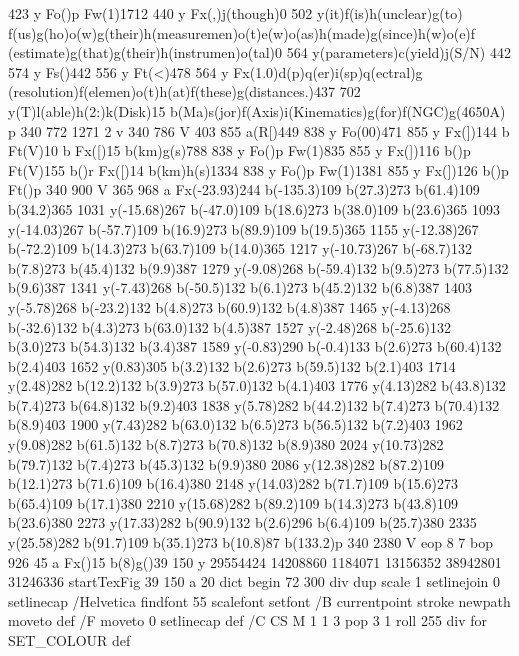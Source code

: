 {{{{{{{{{{{{{{{{423 y Fo()p Fw(1)1712 440 y Fx(,)j(though)0 502 y(it)f(is)h(unclear)g(to)
f(us)g(ho)o(w)g(their)h(measuremen)o(t)e(w)o(as)h(made)g(since)h(w)o(e)f
(estimate)g(that)g(their)h(instrumen)o(tal)0 564 y(parameters)c(yield)j(S/N)
442 574 y Fs()442 556 y Ft(<)478 564 y Fx(1.0)d(p)q(er)i(sp)q(ectral)g
(resolution)f(elemen)o(t)h(at)f(these)g(distances.)437 702
y(T)l(able)h(2:)k(Disk)15 b(Ma)s(jor)f(Axis)i(Kinematics)g(for)f(NGC)g(4650A)
p 340 772 1271 2 v 340 786 V 403 855 a(R[)449 838 y Fo(00)471
855 y Fx(])144 b Ft(V)10 b Fx([)15 b(km)g(s)788 838 y Fo()p
Fw(1)835 855 y Fx(])116 b()p Ft(V)155 b()r Fx([)14
b(km)h(s)1334 838 y Fo()p Fw(1)1381 855 y Fx(])126 b()p
Ft()p 340 900 V 365 968 a Fx(-23.93)244 b(-135.3)109 b(27.3)273
b(61.4)109 b(34.2)365 1031 y(-15.68)267 b(-47.0)109 b(18.6)273
b(38.0)109 b(23.6)365 1093 y(-14.03)267 b(-57.7)109 b(16.9)273
b(89.9)109 b(19.5)365 1155 y(-12.38)267 b(-72.2)109 b(14.3)273
b(63.7)109 b(14.0)365 1217 y(-10.73)267 b(-68.7)132 b(7.8)273
b(45.4)132 b(9.9)387 1279 y(-9.08)268 b(-59.4)132 b(9.5)273
b(77.5)132 b(9.6)387 1341 y(-7.43)268 b(-50.5)132 b(6.1)273
b(45.2)132 b(6.8)387 1403 y(-5.78)268 b(-23.2)132 b(4.8)273
b(60.9)132 b(4.8)387 1465 y(-4.13)268 b(-32.6)132 b(4.3)273
b(63.0)132 b(4.5)387 1527 y(-2.48)268 b(-25.6)132 b(3.0)273
b(54.3)132 b(3.4)387 1589 y(-0.83)290 b(-0.4)133 b(2.6)273
b(60.4)132 b(2.4)403 1652 y(0.83)305 b(3.2)132 b(2.6)273 b(59.5)132
b(2.1)403 1714 y(2.48)282 b(12.2)132 b(3.9)273 b(57.0)132 b(4.1)403
1776 y(4.13)282 b(43.8)132 b(7.4)273 b(64.8)132 b(9.2)403 1838
y(5.78)282 b(44.2)132 b(7.4)273 b(70.4)132 b(8.9)403 1900 y(7.43)282
b(63.0)132 b(6.5)273 b(56.5)132 b(7.2)403 1962 y(9.08)282 b(61.5)132
b(8.7)273 b(70.8)132 b(8.9)380 2024 y(10.73)282 b(79.7)132
b(7.4)273 b(45.3)132 b(9.9)380 2086 y(12.38)282 b(87.2)109
b(12.1)273 b(71.6)109 b(16.4)380 2148 y(14.03)282 b(71.7)109
b(15.6)273 b(65.4)109 b(17.1)380 2210 y(15.68)282 b(89.2)109
b(14.3)273 b(43.8)109 b(23.6)380 2273 y(17.33)282 b(90.9)132
b(2.6)296 b(6.4)109 b(25.7)380 2335 y(25.58)282 b(91.7)109
b(35.1)273 b(10.8)87 b(133.2)p 340 2380 V eop
8 7 bop 926 45 a Fx({)15 b(8)g({)39 150 y
 29554424 14208860 1184071 13156352 38942801 31246336 startTexFig
 39 150 a
 20 dict begin
72 300 div dup scale
1 setlinejoin 0 setlinecap
/Helvetica findfont 55 scalefont setfont 
/B { currentpoint stroke newpath moveto } def
/F { moveto 0 setlinecap} def
/C { CS M 1 1 3 { pop 3 1 roll 255 div } for SET_COLOUR } def
}}}}}}}}}}}}}}}}}}

